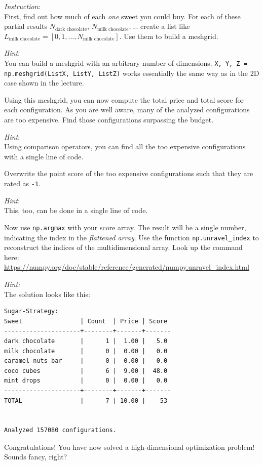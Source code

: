 \documentclass[
	english,
	fontsize=10pt,
	parskip=half,
	titlepage=true,
	DIV=12
]{scrartcl}
\newcommand*{\inPy}[1]{\texttt{#1}}
\begin{document}
\emph{Instruction}:\\
First, find out how much of each \emph{one} sweet you could buy. For each of these partial results $N_{\text{dark chocolate}}$, $N_{\text{milk chocolate}}, ...$ create a list like $L_{\text{milk chocolate}} = [0, 1, ..., N_{\text{milk chocolate}}]$. Use them to build a meshgrid.

\emph{Hint}:\\
You can build a meshgrid with an arbitrary number of dimensions. \texttt{X, Y, Z = np.meshgrid(ListX, ListY, ListZ)} works essentially the same way as in the 2D case shown in the lecture.

Using this meshgrid, you can now compute the total price and total score for each configuration. As you are well aware, many of the analyzed configurations are too expensive. Find those configurations surpassing the budget.

\emph{Hint}:\\
Using comparison operators, you can find all the too expensive configurations with a single line of code.

Overwrite the point score of the too expensive configurations such that they are rated as \inPy{-1}.

\emph{Hint}:\\
This, too, can be done in a single line of code.

Now use \texttt{np.argmax} with your score array. The result will be a single number, indicating the index in the \emph{flattened array}. Use the function  \texttt{np.unravel\_index} to reconstruct the indices of the multidimensional array. Look up the command here: \url{https://numpy.org/doc/stable/reference/generated/numpy.unravel_index.html}

\emph{Hint:}\\
The solution looks like this:
\begin{verbatim}
Sugar-Strategy:
Sweet                | Count  | Price | Score 
---------------------+--------+-------+-------
dark chocolate       |      1 |  1.00 |   5.0
milk chocolate       |      0 |  0.00 |   0.0
caramel nuts bar     |      0 |  0.00 |   0.0
coco cubes           |      6 |  9.00 |  48.0
mint drops           |      0 |  0.00 |   0.0
---------------------+--------+-------+-------
TOTAL                |      7 | 10.00 |    53


Analyzed 157080 configurations.
\end{verbatim}

Congratulations! You have now solved a high-dimensional optimization problem! Sounds fancy, right?
\end{document}
